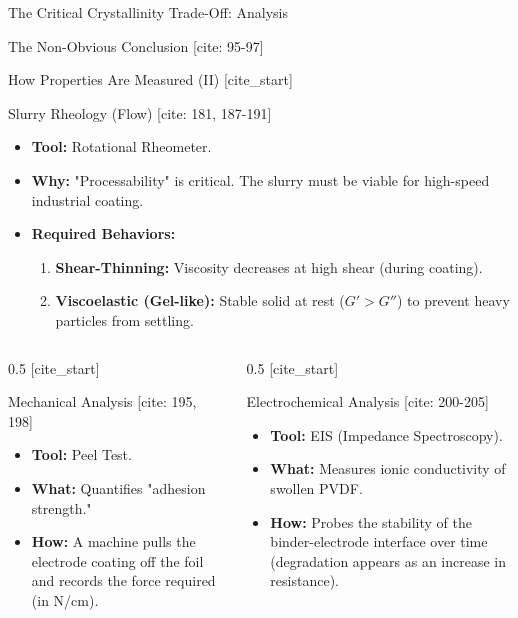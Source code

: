\documentclass[aspectratio=169]{beamer}
\begin{document}
\begin{frame}{The Critical Crystallinity Trade-Off: Analysis}
\begin{alertblock}{The Non-Obvious Conclusion [cite: 95-97]}
\begin{frame}{How Properties Are Measured (II)}
    [cite_start]\begin{block}{Slurry Rheology (Flow) [cite: 181, 187-191]}
        \begin{itemize}
            \item \textbf{Tool:} Rotational Rheometer.
            \item \textbf{Why:} "Processability" is critical. The slurry must be viable for high-speed industrial coating.
            \item \textbf{Required Behaviors:}
                \begin{enumerate}
                    \item \textbf{Shear-Thinning:} Viscosity decreases at high shear (during coating).
                    \item \textbf{Viscoelastic (Gel-like):} Stable solid at rest ($G' > G''$) to prevent heavy particles from settling.
                \end{enumerate}
        \end{itemize}
    \end{block}
    
    \begin{columns}[T]
        \begin{column}{0.5\textwidth}
            [cite_start]\begin{block}{Mechanical Analysis [cite: 195, 198]}
                \begin{itemize}
                    \item \textbf{Tool:} Peel Test.
                    \item \textbf{What:} Quantifies "adhesion strength."
                    \item \textbf{How:} A machine pulls the electrode coating off the foil and records the force required (in N/cm).
                \end{itemize}
            \end{block}
        \end{column}
        \begin{column}{0.5\textwidth}
            [cite_start]\begin{block}{Electrochemical Analysis [cite: 200-205]}
                \begin{itemize}
                    \item \textbf{Tool:} EIS (Impedance Spectroscopy).
                    \item \textbf{What:} Measures ionic conductivity of swollen PVDF.
                    \item \textbf{How:} Probes the stability of the binder-electrode interface over time (degradation appears as an increase in resistance).
                \end{itemize}
            \end{block}
        \end{column}
    \end{columns}
\end{frame}


\end{alertblock}
\end{frame}
\end{document}
